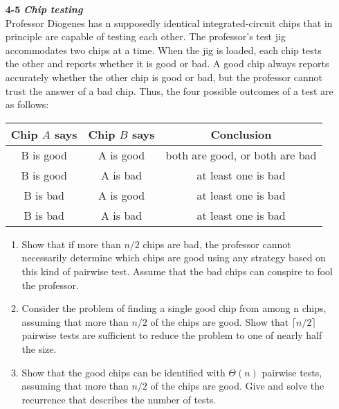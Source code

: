 \documentclass[fontsize=12pt,paper=a4]{book}
\begin{document}
\begin{enumerate}
	\item[\textbf{4-5}]
		\textbf{\textit{Chip testing}}\\
		Professor Diogenes has n supposedly identical integrated-circuit chips that in principle are capable of testing each other. The professor's test jig accommodates two
chips at a time. When the jig is loaded, each chip tests the other and reports whether
it is good or bad. A good chip always reports accurately whether the other chip is
good or bad, but the professor cannot trust the answer of a bad chip. Thus, the four
possible outcomes of a test are as follows: \\
		\begin{tabular}{c c c}
		Chip $A$ says & Chip $B$ says & Conclusion \\
		\hline
		B is good & A is good & both are good, or both are bad\\
		B is good & A is bad & at least one is bad\\
		B is bad & A is good & at least one is bad\\
		B is bad & A is bad & at least one is bad		
		\end{tabular}
		\begin{enumerate}
			\item Show that if more than $n/2$ chips are bad, the professor cannot necessarily determine which chips are good using any strategy based on this kind of pairwise test. Assume that the bad chips can conspire to fool the professor.
			\item Consider the problem of finding a single good chip from among n chips, assuming that more than $n/2$ of the chips are good. Show that $\lceil n/2 \rceil$ pairwise tests are sufficient to reduce the problem to one of nearly half the size.
			\item Show that the good chips can be identified with $\Theta(n)$ pairwise tests, assuming that more than $n/2$ of the chips are good. Give and solve the recurrence that describes the number of tests.
		\end{enumerate}
		

\end{enumerate}
\end{document}
